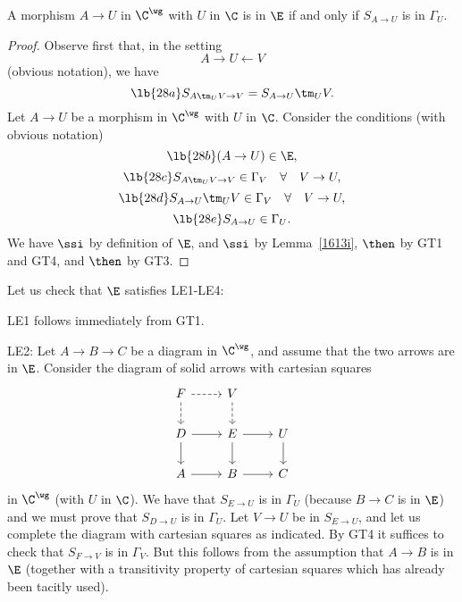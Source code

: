 \documentclass[12pt]{article}
\theoremstyle{remark}
\theoremstyle{definition}
\begin{document}
\begin{lem}
A morphism $A\to U$ in $\C^\wg$ with $U$ in $\C$ is in $\E$ if and only if $S_{A\to U}$ is in $\Gamma_U$. 
\end{lem}

\begin{proof}
Observe first that, in the setting 
$$
A\to U\leftarrow V
$$ 
(obvious notation), we have 
\begin{equation}\lb{28a}
S_{A\tm_UV\to V}=S_{A\to U}\tm_UV.
\end{equation} 
Let $A\to U$ be a morphism in $\C^\wg$ with $U$ in $\C$. Consider the conditions (with obvious notation) 
\begin{equation}\lb{28b}
(A\to U)\in\E,
\end{equation}
\begin{equation}\lb{28c}
S_{A\tm_UV\to V}\in\Gamma_V\quad\forall\quad V\to U,
\end{equation}
\begin{equation}\lb{28d}
S_{A\to U}\tm_UV\in\Gamma_V\quad\forall\quad V\to U,
\end{equation}
\begin{equation}\lb{28e}
S_{A\to U}\in\Gamma_U.
\end{equation} 
We have  $\ssi$  by definition of $\E$, and  $\ssi$  by Lemma~\ref{1613i},  $\then$  by GT1 and GT4, and  $\then$  by GT3.
\end{proof}

Let us check that $\E$ satisfies LE1-LE4:

\nn LE1 follows immediately from GT1.

\nn LE2: Let $A\to B\to C$ be a diagram in $\C^\wg$, and assume that the two arrows are in $\E$. Consider the diagram of solid arrows with cartesian squares 
$$
\begin{tikzcd}
F\ar[dashed]{r}\ar[dashed]{d}&V\ar[dashed]{d}\\ 
D\ar{r}\ar{d}&E\ar{r}\ar{d}&U\ar{d}\\ 
A\ar{r}&B\ar{r}&C
\end{tikzcd}
$$
in $\C^\wg$ (with $U$ in $\C$). We have that $S_{E\to U}$ is in $\Gamma_U$ (because $B\to C$ is in $\E$) and we must prove that $S_{D\to U}$ is in $\Gamma_U$. Let $V\to U$ be in $S_{E\to U}$, and let us complete the diagram with cartesian squares as indicated. By GT4 it suffices to check that $S_{F\to V}$ is in $\Gamma_V$. But this follows from the assumption that $A\to B$ is in $\E$ (together with a transitivity property of cartesian squares which has already been tacitly used).
\end{document}
